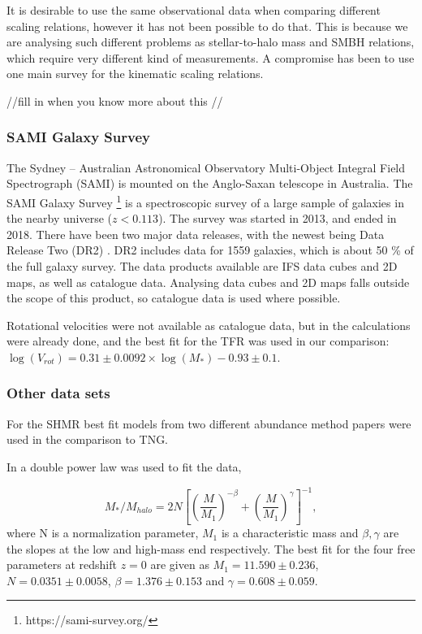 It is desirable to use the same observational data when comparing different scaling relations, however it has not been possible to do that. This is because we are analysing such different problems as stellar-to-halo mass and SMBH relations, which require very different kind of measurements. A compromise has been to use one main survey for the kinematic scaling relations. 

//fill in when you know more about this //

\subsubsection{SAMI Galaxy Survey}
The Sydney – Australian Astronomical Observatory Multi-Object Integral Field Spectrograph (SAMI) is mounted on the Anglo-Saxan telescope in Australia. The SAMI Galaxy Survey \footnote{https://sami-survey.org/} is a spectroscopic survey of a large sample of galaxies in the nearby universe ($z < 0.113$). The survey was started in 2013, and ended in 2018. There have been two major data releases, with the newest being Data Release Two (DR2) \parencite{Scott2018}. DR2 includes data for 1559 galaxies, which is about 50 \% of the full galaxy survey. The data products available are IFS data cubes and 2D maps, as well as catalogue data. Analysing data cubes and 2D maps falls outside the scope of this product, so catalogue data is used where possible. 

Rotational velocities were not available as catalogue data, but in \cite{Bloom2017} the calculations were already done, and the best fit for the TFR was used in our comparison: $\log(V_{rot}) = 0.31 \pm 0.0092 \times \log(M_*)-0.93 \pm 0.1$.

\subsubsection{Other data sets}
For the SHMR best fit models from two different abundance method papers were used in the comparison to TNG.

In \cite{Moster2012} a double power law was used to fit the data,

\begin{equation}
	M_{*}/M_{halo} = 2 N[(\frac{M}{M_1})^{-\beta}+(\frac{M}{M_1})^{\gamma}]^{-1},
\end{equation}
where N is a normalization parameter, $M_1$ is a characteristic mass and $\beta, \gamma$ are the slopes at the low and high-mass end respectively. The best fit for the four free parameters at redshift $z=0$ are given as $M_1 = 11.590 \pm 0.236$, $N = 0.0351 \pm 0.0058$, $\beta = 1.376 \pm 0.153$ and $\gamma = 0.608 \pm 0.059$.

